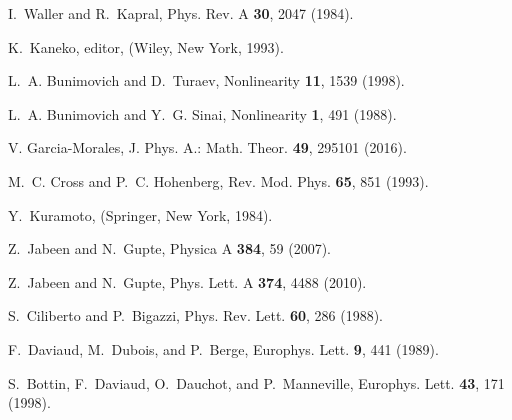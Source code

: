 \documentclass[aps,pre,preprint,floatfix]{revtex4}
\theoremstyle{plain} \newtheorem{defi}{Definition}[section]
\theoremstyle{plain} \newtheorem{prop}{Proposition}[section]
\theoremstyle{plain} \newtheorem{theor}{Theorem}[section]
\theoremstyle{plain} \newtheorem{lemma}{Lemma}[section]
\theoremstyle{plain} \newtheorem*{corol}{Corollary}
\theoremstyle{remark} \newtheorem*{rem}{Remark}
\theoremstyle{plain} \newtheorem{exer}{Exercise}[section]
\theoremstyle{remark} \newtheorem*{ans}{Answer}
\begin{document}
\begin{thebibliography}{9}
%

I.~Waller and R.~Kapral,
\newblock Phys. Rev. A {\bf 30}, 2047 (1984).


K.~Kaneko, editor,
 (Wiley, New
  York, 1993).

L.~A. Bunimovich and D.~Turaev,
\newblock Nonlinearity {\bf 11}, 1539 (1998).

L.~A. Bunimovich and Y.~G. Sinai,
\newblock Nonlinearity {\bf 1}, 491 (1988).

%
%

V. Garcia-Morales, J. Phys. A.: Math. Theor. {\bf 49}, 295101 (2016). 

M.~C. Cross and P.~C. Hohenberg,
\newblock Rev. Mod. Phys. {\bf 65}, 851 (1993).

%

Y.~Kuramoto,
 (Springer, New
  York, 1984).
  
Z.~Jabeen and N.~Gupte,
\newblock Physica A {\bf 384}, 59 (2007).

Z.~Jabeen and N.~Gupte,
\newblock Phys. Lett. A {\bf 374}, 4488 (2010).  

S.~Ciliberto and P.~Bigazzi,
\newblock Phys. Rev. Lett. {\bf 60}, 286 (1988).

F.~Daviaud, M.~Dubois, and P.~Berge,
\newblock Europhys. Lett. {\bf 9}, 441 (1989).

S.~Bottin, F.~Daviaud, O.~Dauchot, and P.~Manneville,
\newblock Europhys. Lett. {\bf 43}, 171 (1998).


\end{thebibliography}
\end{document}
